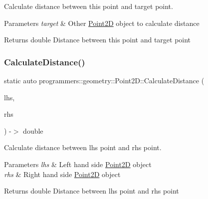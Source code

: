 Calculate distance between this point and target point. 


\begin{DoxyParams}{Parameters}
{\em target} & Other \hyperlink{classprogrammers_1_1geometry_1_1Point2D}{Point2D} object to calculate distance \\
\hline
\end{DoxyParams}
\begin{DoxyReturn}{Returns}
double Distance between this point and target point 
\end{DoxyReturn}
\mbox{\label{classprogrammers_1_1geometry_1_1Point2D_abf28112f1ade679c2801422ca0254441}} 
\subsubsection{\texorpdfstring{Calculate\+Distance()}{CalculateDistance()}\hspace{0.1cm}{\footnotesize\ttfamily [2/2]}}
{\footnotesize\ttfamily static auto programmers\+::geometry\+::\+Point2\+D\+::\+Calculate\+Distance (\begin{DoxyParamCaption}\item[{const \hyperlink{classprogrammers_1_1geometry_1_1Point2D}{Point2D} \&}]{lhs,  }\item[{const \hyperlink{classprogrammers_1_1geometry_1_1Point2D}{Point2D} \&}]{rhs }\end{DoxyParamCaption}) -\/$>$  double\hspace{0.3cm}{\ttfamily [static]}}



Calculate distance between lhs point and rhs point. 


\begin{DoxyParams}{Parameters}
{\em lhs} & Left hand side \hyperlink{classprogrammers_1_1geometry_1_1Point2D}{Point2D} object \\
\hline
{\em rhs} & Right hand side \hyperlink{classprogrammers_1_1geometry_1_1Point2D}{Point2D} object \\
\hline
\end{DoxyParams}
\begin{DoxyReturn}{Returns}
double Distance between lhs point and rhs point 
\end{DoxyReturn}
\mbox{\label{classprogrammers_1_1geometry_1_1Point2D_a41fbc656ae357f7fe365ed5b6eba5eb1}} 
